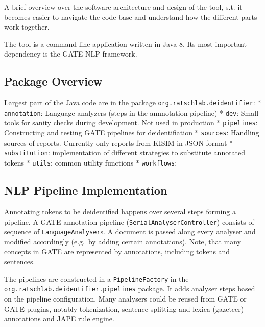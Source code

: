 
A brief overview over the software architecture and design of the tool,
s.t. it becomes easier to navigate the code base and understand how the
different parts work together.

The tool is a command line application written in Java 8. Its most
important dependency is the GATE NLP framework.

\subsection{Package Overview}\label{package-overview}

Largest part of the Java code are in the package
\texttt{org.ratschlab.deidentifier}: * \texttt{annotation}: Language
analyzers (steps in the annnotation pipeline) * \texttt{dev}: Small
tools for sanity checks during development. Not used in production *
\texttt{pipelines}: Constructing and testing GATE pipelines for
deidentifiation * \texttt{sources}: Handling sources of reports.
Currently only reports from KISIM in JSON format *
\texttt{substitution}: implementation of different strategies to
substitute annotated tokens * \texttt{utils}: common utility functions *
\texttt{workflows}:

\subsection{NLP Pipeline
Implementation}\label{nlp-pipeline-implementation}

Annotating tokens to be deidentified happens over several steps forming
a pipeline. A GATE annotation pipeline
(\texttt{SerialAnalyserController}) consists of sequence of
\texttt{LanguageAnalyser}s. A document is passed along every analyser
and modified accordingly (e.g.~by adding certain annotations). Note,
that many concepts in GATE are represented by annotations, including
tokens and sentences.

The pipelines are constructed in a \texttt{PipelineFactory} in the
\texttt{org.ratschlab.deidentifier.pipelines} package. It adds analyser
steps based on the pipeline configuration. Many analysers could be
reused from GATE or GATE plugins, notably tokenization, sentence
splitting and lexica (gazeteer) annotations and JAPE rule engine.

